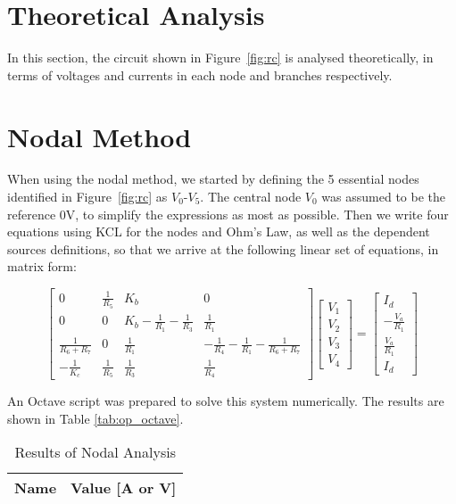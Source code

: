 \section{Theoretical Analysis}
\label{sec:analysis}

In this section, the circuit shown in Figure~\ref{fig:rc} is analysed
theoretically, in terms of voltages and currents in each node and branches respectively.


\section{Nodal Method}

When using the nodal method, we started by defining the 5 essential nodes identified in Figure~\ref{fig:rc} as $V_0$-$V_5$. The central node $V_0$ was assumed to be the reference 0V, to simplify the expressions as most as possible.
Then we write four equations using KCL for the nodes and Ohm's Law, as well as the dependent sources definitions, so that we arrive at the following linear set of equations, in matrix form:


\[
\begin{bmatrix}
0 & \frac{1}{R_5} & K_b & 0 \\
0 & 0 & K_b - \frac{1}{R_1} - \frac{1}{R_3} & \frac{1}{R_1} \\
\frac{1}{R_6 + R_7}  & 0  & \frac{1}{R_1}  & -\frac{1}{R_4}-\frac{1}{R_1}-\frac{1}{R_6+R_7}  \\
-\frac{1}{K_c} & \frac{1}{R_5} & \frac{1}{R_3} & \frac{1}{R_4}  
\end{bmatrix}
\begin{bmatrix}
V_1 \\ V_2 \\ V_3 \\ V_4 
\end{bmatrix}
=
\begin{bmatrix}
I_d \\ -\frac{V_a}{R_1} \\ \frac{V_a}{R_1} \\ I_d
\end{bmatrix}
\]

An Octave script was prepared to solve this system numerically. The results are shown in Table \ref{tab:op_octave}.

\begin{table}[h]
  \centering
  \begin{tabular}{|l|r|}
    \hline
    {\bf Name} & {\bf Value [A or V]} \\ \hline
    
  \end{tabular}
  \caption{Results of Nodal Analysis}
  \label{tab:op_octave_nodal}
\end{table}

